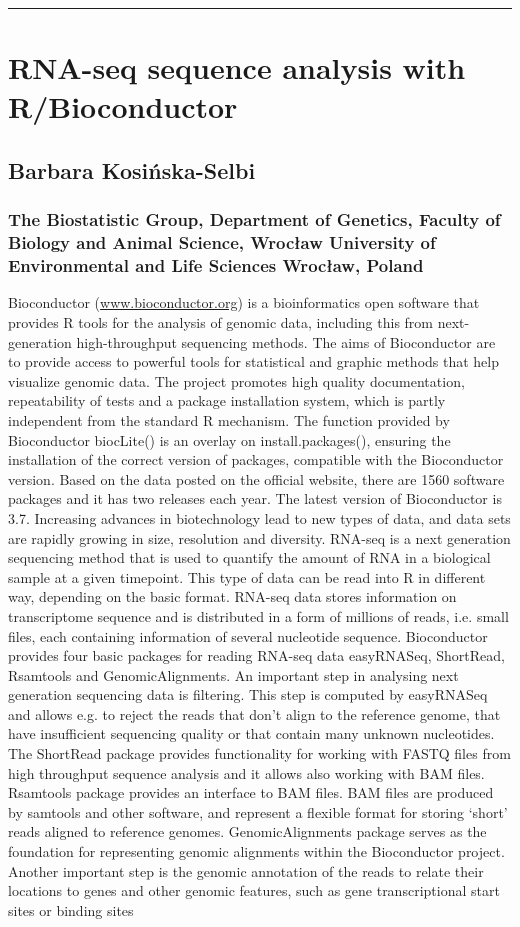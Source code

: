 \documentclass [12pt]{article}
\begin{document}
\noindent\rule{\textwidth}{1pt}
\section{RNA-seq sequence analysis with R/Bioconductor}
\subsection*{Barbara	Kosińska-Selbi}
\subsubsection*{The Biostatistic Group, Department of Genetics, Faculty of Biology and Animal Science, Wrocław University of Environmental and Life Sciences Wrocław, Poland}

Bioconductor (\url{www.bioconductor.org}) is a bioinformatics open software that provides R tools for the analysis of genomic data, including this from next-generation high-throughput sequencing methods. The aims of Bioconductor are to provide access to powerful tools for statistical and graphic methods that help visualize genomic data. The project promotes high quality documentation, repeatability of tests and a package installation system, which is partly independent from the standard R mechanism. The function provided by Bioconductor biocLite() is an overlay on install.packages(), ensuring the installation of the correct version of packages, compatible with the Bioconductor version. Based on the data posted on the official website, there are 1560 software packages and it has two releases each year. The latest version of Bioconductor is 3.7. Increasing advances in biotechnology lead to new types of data, and data sets are rapidly growing in size, resolution and diversity. RNA-seq is a next generation sequencing method that is used to quantify the amount of RNA in a biological sample at a given timepoint. This type of data can be read into R in different way, depending on the basic format. RNA-seq data stores information on transcriptome sequence and is distributed in a form of millions of reads, i.e. small files, each containing information of several nucleotide sequence. Bioconductor provides four basic packages for reading RNA-seq data easyRNASeq, ShortRead, Rsamtools and GenomicAlignments. An important step in analysing next generation sequencing data is filtering. This step is computed by easyRNASeq and allows e.g. to reject the reads that don't align to the reference genome, that have insufficient sequencing quality or that contain many unknown nucleotides. The ShortRead package provides functionality for working with FASTQ files from high throughput sequence analysis and it allows also working with BAM files. Rsamtools package provides an interface to BAM files. BAM files are produced by samtools and other software, and represent a flexible format for storing ‘short’ reads aligned to reference genomes. GenomicAlignments package serves as the foundation for representing genomic alignments within the Bioconductor project. Another important step is the genomic annotation of the reads to relate their locations to genes and other genomic features, such as gene transcriptional start sites or binding sites 
\end{document}
